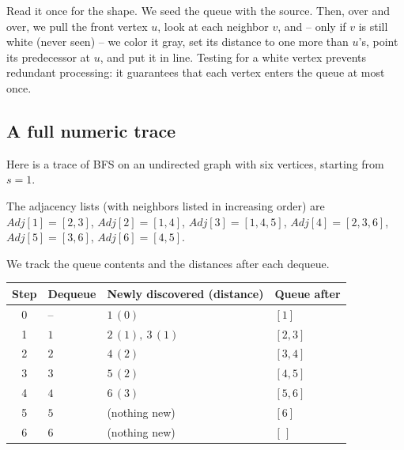 Read it once for the shape. We seed the queue with the source. Then, over and
over, we pull the front vertex $u$, look at each neighbor $v$, and -- only if $v$
is still white (never seen) -- we color it gray, set its distance to one more
than $u$'s, point its predecessor at $u$, and put it in line. Testing for a
white vertex prevents redundant processing: it guarantees that each vertex enters
the queue at most once.

\subsection{A full numeric trace}
\label{ch22:bfs-trace}

Here is a trace of BFS on an undirected graph with six vertices, starting from $s = 1$.

\begin{center}
\end{center}

The adjacency lists (with neighbors listed in increasing order) are
$\mathit{Adj}[1]=[2,3]$, $\mathit{Adj}[2]=[1,4]$, $\mathit{Adj}[3]=[1,4,5]$,
$\mathit{Adj}[4]=[2,3,6]$, $\mathit{Adj}[5]=[3,6]$, $\mathit{Adj}[6]=[4,5]$.

We track the queue contents and the distances after each dequeue.

\begin{center}
\begin{tabular}{c l l l}
\toprule
Step & Dequeue & Newly discovered (distance) & Queue after \\
\midrule
0 & --        & $1\,(0)$                 & $[1]$ \\
1 & $1$       & $2\,(1),\ 3\,(1)$        & $[2,3]$ \\
2 & $2$       & $4\,(2)$                 & $[3,4]$ \\
3 & $3$       & $5\,(2)$                 & $[4,5]$ \\
4 & $4$       & $6\,(3)$                 & $[5,6]$ \\
5 & $5$       & (nothing new)            & $[6]$ \\
6 & $6$       & (nothing new)            & $[\,]$ \\
\bottomrule
\end{tabular}
\end{center}

